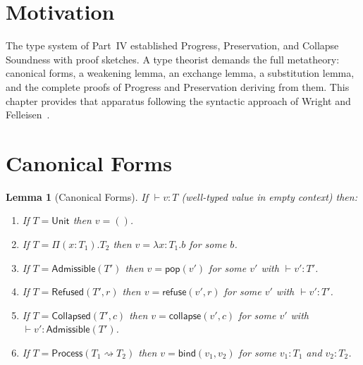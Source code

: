 \documentclass[12pt, a4paper, openany]{book}
\theoremstyle{plain}
\newtheorem{lemma}[theorem]{Lemma}
\theoremstyle{definition}
\theoremstyle{remark}
\newcommand{\Adm}{\mathsf{Admissible}}
\newcommand{\Rfsd}{\mathsf{Refused}}
\newcommand{\Col}{\mathsf{Collapsed}}
\newcommand{\Proc}{\mathsf{Process}}
\begin{document}
\section{Motivation}

The type system of Part~IV established Progress, Preservation, and Collapse
Soundness with proof sketches. A type theorist demands the full metatheory:
canonical forms, a weakening lemma, an exchange lemma, a substitution lemma,
and the complete proofs of Progress and Preservation deriving from them. This
chapter provides that apparatus following the syntactic approach of Wright and
Felleisen~\cite{wright94}.

\section{Canonical Forms}

\begin{lemma}[Canonical Forms]
\label{lem:canonical}
If $\vdash v : T$ (well-typed value in empty context) then:
\begin{enumerate}
\item If $T = \mathsf{Unit}$ then $v = ()$.
\item If $T = \Pi(x:T_1).T_2$ then $v = \lambda x:T_1.b$ for some $b$.
\item If $T = \Adm(T')$ then $v = \mathsf{pop}(v')$ for some $v'$ with
$\vdash v' : T'$.
\item If $T = \Rfsd(T', r)$ then $v = \mathsf{refuse}(v', r)$ for some $v'$
with $\vdash v' : T'$.
\item If $T = \Col(T', c)$ then $v = \mathsf{collapse}(v', c)$ for some $v'$
with $\vdash v' : \Adm(T')$.
\item If $T = \Proc(T_1 \rightsquigarrow T_2)$ then $v = \mathsf{bind}(v_1, v_2)$
for some $v_1 : T_1$ and $v_2 : T_2$.
\end{enumerate}
\end{lemma}
\end{document}
